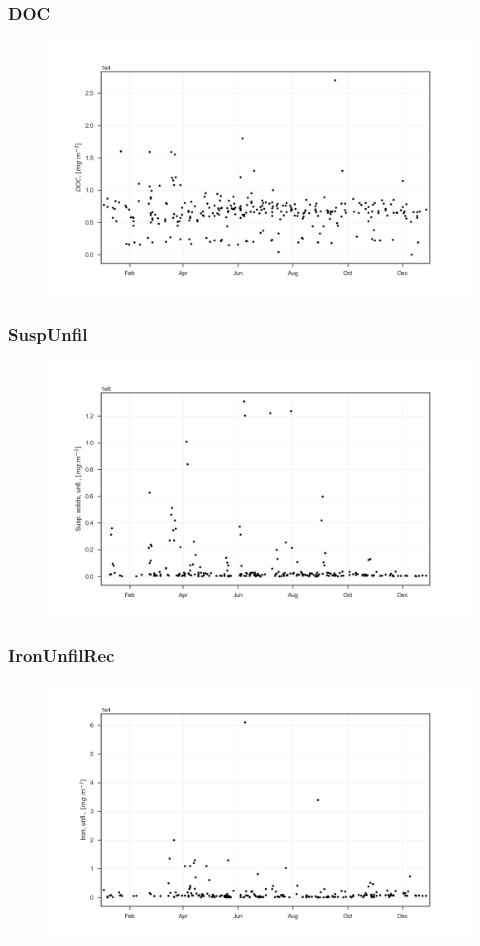 \documentclass{beamer}
\begin{document}
\begin{frame}
\frametitle{DOC}
\begin{figure}
\includegraphics[width=\textwidth]{rivers/all/1yr_graph/DOC.png}
\end{figure}
\end{frame}

\begin{frame}
\frametitle{SuspUnfil}
\begin{figure}
\includegraphics[width=\textwidth]{rivers/all/1yr_graph/SuspUnfil.png}
\end{figure}
\end{frame}

\begin{frame}
\frametitle{IronUnfilRec}
\begin{figure}
\includegraphics[width=\textwidth]{rivers/all/1yr_graph/IronUnfilRec.png}
\end{figure}
\end{frame}
\end{document}
